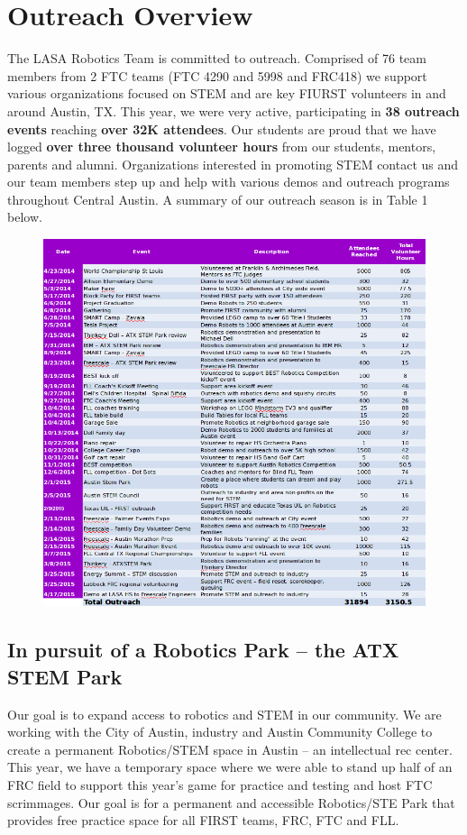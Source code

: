 \clearpage
\newpage

\section{Outreach Overview}
The LASA Robotics Team is committed to outreach.  Comprised of 76 team members from 2 FTC teams (FTC 4290 and 5998 and FRC418) we support various organizations focused on STEM and are key FIURST volunteers in and around Austin, TX.  This year, we were very active, participating in {\bf 38 outreach events} reaching {\bf over 32K attendees}.  Our students are proud that we have logged {\bf over three thousand volunteer hours} from our students, mentors, parents and alumni.   Organizations interested in promoting STEM contact us and our team members step up and help with various demos and outreach programs throughout Central Austin.  A summary of our outreach season is in Table 1 below. \\

\begin{figure}[H]
	\centering
	\includegraphics[width=\linewidth]{outreach}
	\label{fig:outreach}
\end{figure}

\subsection{In pursuit of a Robotics Park – the ATX STEM Park}
Our goal is to expand access to robotics and STEM in our community. We are working with the City of Austin, industry and Austin Community College to create a permanent Robotics/STEM space in Austin – an intellectual rec center.   This year, we have a temporary space where we were able to stand up half of an FRC field to support this year’s game for practice and testing and host FTC scrimmages.  Our goal is for a permanent and accessible Robotics/STE Park that provides free practice space for all FIRST teams, FRC, FTC and FLL.

